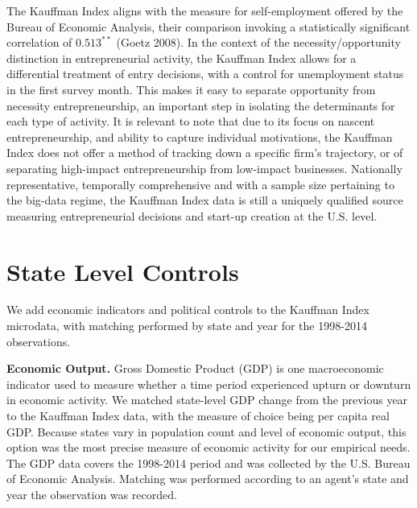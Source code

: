 The Kauffman Index aligns with the measure for self-employment offered by the Bureau of Economic Analysis, their comparison invoking a statistically significant correlation of $0.513^{**}$ (Goetz 2008). In the context of the necessity/opportunity distinction in entrepreneurial activity, the Kauffman Index allows for a differential treatment of entry decisions, with a control for unemployment status in the first survey month. This makes it easy to separate opportunity from necessity entrepreneurship, an important step in isolating the determinants for each type of activity. It is relevant to note that due to its focus on nascent entrepreneurship, and ability to capture individual motivations, the Kauffman Index does not offer a method of tracking down a specific firm’s trajectory, or of separating high-impact entrepreneurship from low-impact businesses. Nationally representative, temporally comprehensive and with a sample size pertaining to the big-data regime, the Kauffman Index data is still a uniquely qualified source measuring entrepreneurial decisions and start-up creation at the U.S. level. 

\section{State Level Controls}
We add economic indicators and political controls to the Kauffman Index microdata, with matching performed by state and year for the 1998-2014 observations. 

\textbf{Economic Output.} Gross Domestic Product (GDP) is one macroeconomic indicator used to measure whether a time period experienced upturn or downturn in economic activity. We matched state-level GDP change from the previous year to the Kauffman Index data, with the measure of choice being per capita real GDP. Because states vary in population count and level of economic output, this option was the most precise measure of economic activity for our empirical needs. The GDP data covers the 1998-2014 period and was collected by the U.S. Bureau of Economic Analysis. Matching was performed according to an agent’s state and year the observation was recorded.  

